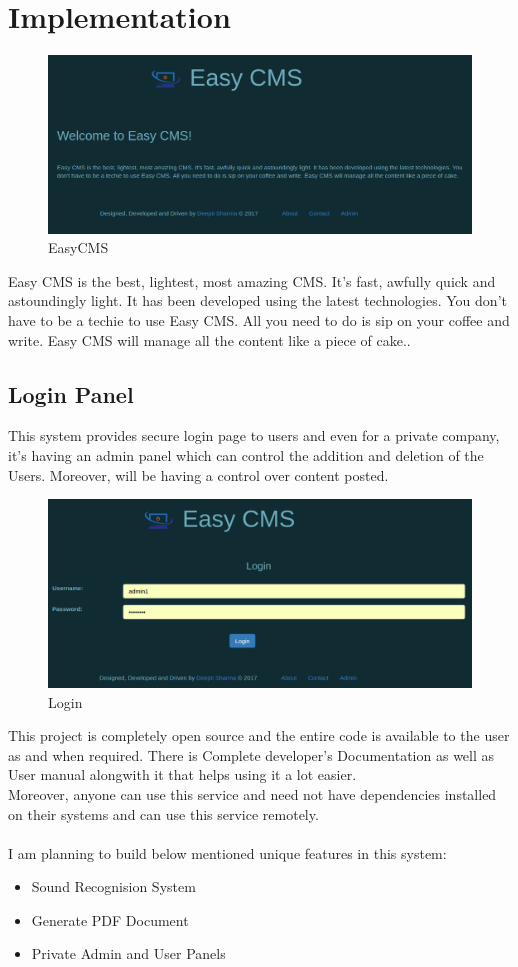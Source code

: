 
\section{ Implementation}
\begin{figure}[ht]
	\centering \includegraphics[scale=.45]{input/images/easy1.png}
	\caption{EasyCMS}
\end{figure}

 Easy CMS is the best, lightest, most amazing CMS. It's fast, awfully quick and astoundingly light. It has been developed using the latest technologies. You don't have to be a techie to use Easy CMS. All you need to do is sip on your coffee and write. Easy CMS will manage all the content like a piece of cake..\\
 

 \subsection{Login Panel}

This system provides secure login page to users and even for a private company, it's having an admin panel which can control the addition and deletion of the Users. Moreover, will be having a control over content posted.

 \begin{figure}[h!]
	\centering \includegraphics[scale=.45]{input/images/easy2.png}
	\caption{Login}
\end{figure}
\newpage
This project is completely open source and the entire code is available 
to the user as and when required. There is Complete developer's 
Documentation as well as User manual alongwith it that helps using it a lot easier.\\
Moreover, anyone can use this service and need not have dependencies installed on their systems and can use this service remotely.\\\\

I am planning to build below mentioned unique features in this system:
\begin{itemize}
\item Sound Recognision System
\item Generate PDF Document
\item Private Admin and User Panels

\end{itemize}
